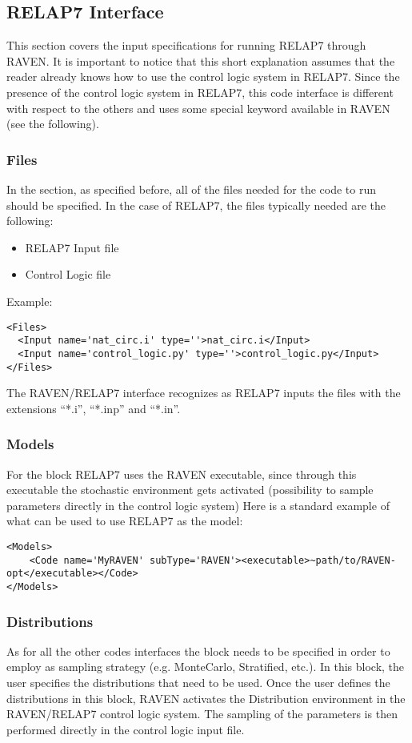 \subsection{RELAP7 Interface}
This section covers the input specifications for running RELAP7 through RAVEN.
It is important to notice that this short explanation assumes that the reader already knows
how to use the control logic system in RELAP7.
Since the presence of the control logic system in RELAP7, this code interface is different with respect to the others
and uses some special keyword available in RAVEN (see the following).

\subsubsection{Files}
In the  section, as specified before, all of the files needed for
the code to run should be specified.
%
In the case of RELAP7, the files typically needed are the following:
\begin{itemize}
  \item RELAP7 Input file
  \item Control Logic file
\end{itemize}
Example:
\begin{lstlisting}[style=XML]
<Files>
  <Input name='nat_circ.i' type=''>nat_circ.i</Input>
  <Input name='control_logic.py' type=''>control_logic.py</Input>
</Files>
\end{lstlisting}
The RAVEN/RELAP7 interface recognizes as RELAP7 inputs the files with the extensions  ``*.i'', ``*.inp'' and ``*.in''.

\subsubsection{Models}
For the  block RELAP7 uses the RAVEN executable, since through this executable the stochastic
environment gets activated (possibility to sample parameters directly in the control logic system)
%
Here is a standard example of what can be used to use RELAP7 as the model:
\begin{lstlisting}[style=XML]
<Models>
    <Code name='MyRAVEN' subType='RAVEN'><executable>~path/to/RAVEN-opt</executable></Code>
</Models>
\end{lstlisting}
\subsubsection{Distributions}
As for all the other codes interfaces  the  block needs to be specified in order to employ
as sampling strategy (e.g. MonteCarlo, Stratified, etc.). In this block, the user specifies the distributions that need to be used.
Once the user defines the distributions in this block, RAVEN activates the Distribution environment in the RAVEN/RELAP7 control logic
system. The sampling of the parameters is then performed directly in the control logic input file.

